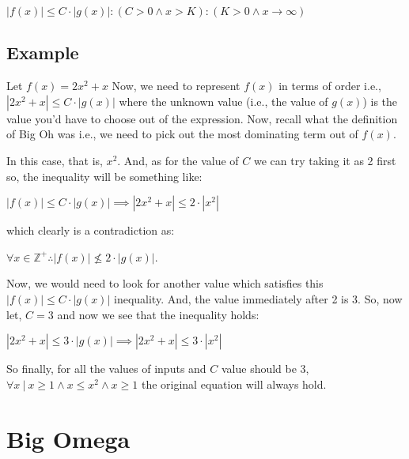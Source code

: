 \documentclass[a4paper,12pt]{article}
\theoremstyle{definition}
\begin{document}
    \begin{center}
        $|f(x)| \leq C \cdot |g(x)| : (C > 0 \wedge x > K) : (K > 0 \wedge x \rightarrow \infty)$
    \end{center}

    \subsection{Example}

    \noindent
    Let $f(x) = 2x^2 + x$ Now, we need to represent $f(x)$ in terms of order i.e.,
    $|2x^2 + x| \leq C \cdot |g(x)|$ where the unknown value (i.e., the value of $g(x)$) is the
    value you'd have to choose out of the expression. Now, recall what the definition of Big Oh was i.e.,
    we need to pick out the most dominating term out of $f(x)$.

    \noindent
    In this case, that is, $x^2$.
    And, as for the value of $C$ we can try taking it as 2 first so, the inequality will be something like:

    \begin{center}
        $|f(x)| \leq C \cdot |g(x)| \implies |2x^2 + x| \leq 2 \cdot |x^2|$
    \end{center}

    \noindent
    which clearly is a contradiction as:

    \begin{center}
        $\forall x \in \mathbb{Z^+} \therefore |f(x)| \nleq 2 \cdot |g(x)|$.
    \end{center}

    \noindent
    Now, we would need to look for another value which satisfies this $|f(x)| \leq C \cdot |g(x)|$ inequality.
    And, the value immediately after 2 is 3. So, now let, $C = 3$ and now we see that the inequality holds:

    \begin{center}
        $|2x^2 + x| \leq 3 \cdot |g(x)| \implies |2x^2 + x| \leq 3 \cdot |x^2|$
    \end{center}

    \noindent
    So finally, for all the values of inputs and $C$ value should be 3,
    $\forall x\ |\ x \geq 1 \wedge x \leq x^2 \wedge x \geq 1$ the original equation will always hold.


    \section{Big Omega}
\end{document}
